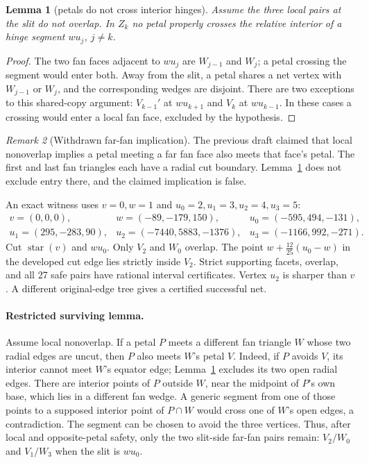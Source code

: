 \documentclass[11pt]{article}
\newtheorem{lemma}{Lemma}
\theoremstyle{definition}
\theoremstyle{remark}
\newtheorem{remark}[lemma]{Remark}
\begin{document}
\begin{lemma}[petals do not cross interior hinges]\label{hinge}
Assume the three local pairs at the slit do not overlap. In $Z_k$ no petal
properly crosses the relative interior of a hinge segment $wu_j$, $j\ne k$.
\end{lemma}
\begin{proof}
The two fan faces adjacent to $wu_j$ are $W_{j-1}$ and $W_j$; a petal crossing the segment would enter both.
Away from the slit, a petal shares a net vertex with $W_{j-1}$ or $W_j$,
and the corresponding wedges are disjoint. There are two exceptions to this
shared-copy argument: $V_{k-1}'$ at $wu_{k+1}$ and $V_k$ at $wu_{k-1}$.
In these cases a crossing would enter a local fan face, excluded by the hypothesis.
\end{proof}

\begin{remark}[Withdrawn far-fan implication]\label{farfan}
The previous draft claimed that local nonoverlap implies a petal meeting
a far fan face also meets that face's petal. The first and last fan triangles
each have a radial cut boundary. Lemma~\ref{hinge} does not exclude entry
there, and the claimed implication is false.
\end{remark}

An exact witness uses $v=0,w=1$ and $u_0=2,u_1=3,u_2=4,u_3=5$:
\[
\begin{array}{lll}
v=(0,0,0),&w=(-89,-179,150),&u_0=(-595,494,-131),\\
u_1=(295,-283,90),&u_2=(-7440,5883,-1376),&u_3=(-1166,992,-271).
\end{array}
\]
Cut $\operatorname{star}(v)$ and $wu_0$. Only $V_2$ and $W_0$ overlap.
The point $w+\tfrac{12}{25}(u_0-w)$ in the developed cut edge lies strictly
inside $V_2$. Strict supporting facets, overlap, and all 27 safe pairs have
rational interval certificates. Vertex $u_2$ is sharper than $v$.
A different original-edge tree gives a certified successful net.

\paragraph{Restricted surviving lemma.}
Assume local nonoverlap. If a petal $P$ meets a different fan triangle $W$
whose two radial edges are uncut, then $P$ also meets $W$'s petal $V$.
Indeed, if $P$ avoids $V$, its interior cannot meet $W$'s equator edge;
Lemma~\ref{hinge} excludes its two open radial edges. There are interior
points of $P$ outside $W$, near the midpoint of $P$'s own base, which lies
in a different fan wedge. A generic segment from one of those points to a
supposed interior point of $P\cap W$ would cross one of $W$'s open edges,
a contradiction. The segment can be chosen to avoid the three vertices.
Thus, after local and opposite-petal safety, only the two slit-side far-fan
pairs remain: $V_2/W_0$ and $V_1/W_3$ when the slit is $wu_0$.
\end{document}
